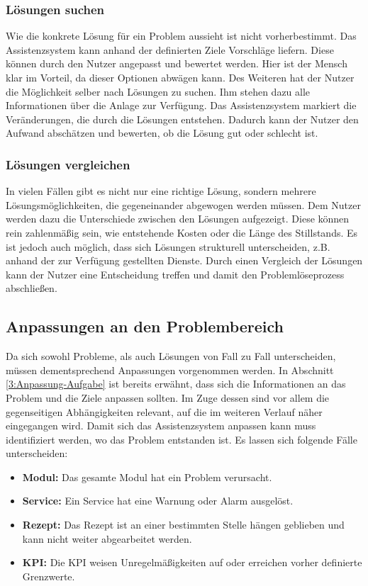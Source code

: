 \subsubsection*{Lösungen suchen}
Wie die konkrete Lösung für ein Problem aussieht ist nicht vorherbestimmt. Das Assistenzsystem kann anhand der definierten Ziele Vorschläge liefern. Diese können durch den Nutzer angepasst und bewertet werden. Hier ist der Mensch klar im Vorteil, da dieser Optionen abwägen kann. Des Weiteren hat der Nutzer die Möglichkeit selber nach Lösungen zu suchen. Ihm stehen dazu alle Informationen über die Anlage zur Verfügung. Das Assistenzsystem markiert die Veränderungen, die durch die Lösungen entstehen. Dadurch kann der Nutzer den Aufwand abschätzen und bewerten, ob die Lösung gut oder schlecht ist.

\subsubsection*{Lösungen vergleichen}
In vielen Fällen gibt es nicht nur eine richtige Lösung, sondern mehrere Lösungsmöglichkeiten, die gegeneinander abgewogen werden müssen. Dem Nutzer werden dazu die Unterschiede zwischen den Lösungen aufgezeigt. Diese können rein zahlenmäßig sein, wie entstehende Kosten oder die Länge des Stillstands. Es ist jedoch auch möglich, dass sich Lösungen strukturell unterscheiden, z.B. anhand der zur Verfügung gestellten Dienste. Durch einen Vergleich der Lösungen kann der Nutzer eine Entscheidung treffen und damit den Problemlöseprozess abschließen.

\subsection{Anpassungen an den Problembereich}
Da sich sowohl Probleme, als auch Lösungen von Fall zu Fall unterscheiden, müssen dementsprechend Anpassungen vorgenommen werden. In Abschnitt \ref{3:Anpassung-Aufgabe} ist bereits erwähnt, dass sich die Informationen an das Problem und die Ziele anpassen sollten. Im Zuge dessen sind vor allem die gegenseitigen Abhängigkeiten relevant, auf die im weiteren Verlauf näher eingegangen wird. Damit sich das Assistenzsystem anpassen kann muss identifiziert werden, wo das Problem entstanden ist. Es lassen sich folgende Fälle unterscheiden:
\begin{itemize}
\item \textbf{Modul:} Das gesamte Modul hat ein Problem verursacht.
\item \textbf{Service:} Ein Service hat eine Warnung oder Alarm ausgelöst.
\item \textbf{Rezept:} Das Rezept ist an einer bestimmten Stelle hängen geblieben und kann nicht weiter abgearbeitet werden.
\item \textbf{KPI:} Die KPI weisen Unregelmäßigkeiten auf oder erreichen vorher definierte Grenzwerte.
\end{itemize}

